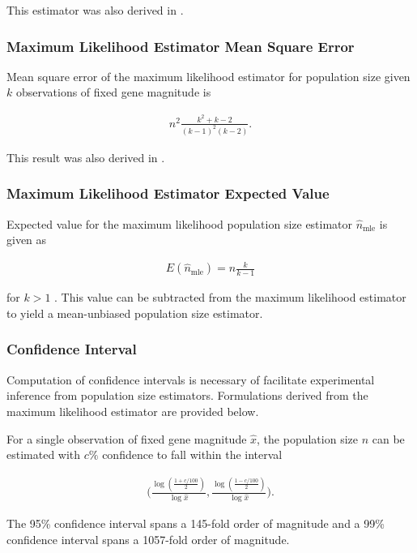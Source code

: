 This estimator was also derived in \citep{varagnolo2010distributed}.

\subsubsection{Maximum Likelihood Estimator Mean Square Error}

Mean square error of the maximum likelihood estimator for population size given $k$ observations of fixed gene magnitude is

\begin{align*}
n^2 \frac{k^{2}+ k-2}{(k-1)^{2}(k-2)}.
\end{align*}

This result was also derived in \citep{varagnolo2010distributed}.

\subsubsection{Maximum Likelihood Estimator Expected Value}

Expected value for the maximum likelihood population size estimator $\hat{n}_\mathrm{mle}$ is given as

\begin{align*}
E(\hat{n}_\mathrm{mle})
= n\frac{k}{k-1}
\end{align*}

for $k>1$ \citep{varagnolo2010distributed}.
This value can be subtracted from the maximum likelihood estimator to yield a mean-unbiased population size estimator.

\subsubsection{Confidence Interval}

Computation of confidence intervals is necessary of facilitate experimental inference from population size estimators.
Formulations derived from the maximum likelihood estimator are provided below.

For a single observation of fixed gene magnitude $\hat{x}$, the population size $n$ can be estimated with $c\%$ confidence to fall within the interval

\begin{align*}
\Big(
\frac{\log(\frac{1+c/100}{2})}{\log\hat{x}},
\frac{\log(\frac{1-c/100}{2})}{\log\hat{x}}
\Big).
\end{align*}

The 95\% confidence interval spans a 145-fold order of magnitude and a 99\% confidence interval spans a 1057-fold order of magnitude.

